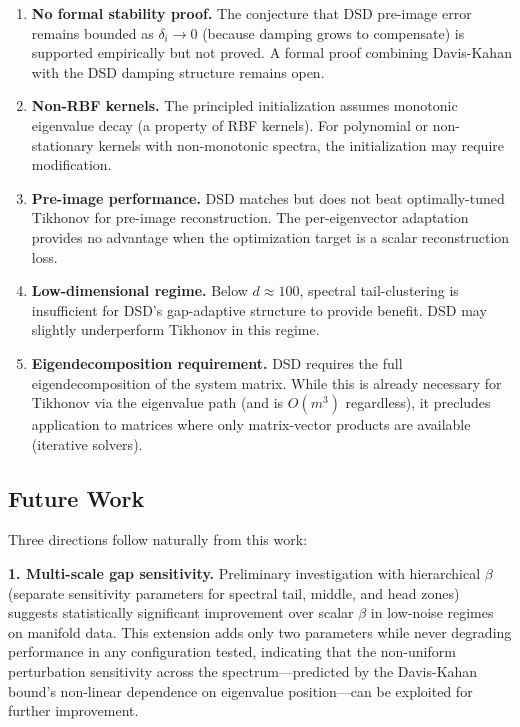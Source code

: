 \documentclass[preprint,review,12pt]{elsarticle}
\begin{document}
\begin{enumerate}
\item \textbf{No formal stability proof.} The conjecture that DSD pre-image error remains bounded as $\delta_i \to 0$ (because damping grows to compensate) is supported empirically but not proved. A formal proof combining Davis-Kahan with the DSD damping structure remains open.

\item \textbf{Non-RBF kernels.} The principled initialization assumes monotonic eigenvalue decay (a property of RBF kernels). For polynomial or non-stationary kernels with non-monotonic spectra, the initialization may require modification.

\item \textbf{Pre-image performance.} DSD matches but does not beat optimally-tuned Tikhonov for pre-image reconstruction. The per-eigenvector adaptation provides no advantage when the optimization target is a scalar reconstruction loss.

\item \textbf{Low-dimensional regime.} Below $d \approx 100$, spectral tail-clustering is insufficient for DSD's gap-adaptive structure to provide benefit. DSD may slightly underperform Tikhonov in this regime.

\item \textbf{Eigendecomposition requirement.} DSD requires the full eigendecomposition of the system matrix. While this is already necessary for Tikhonov via the eigenvalue path (and is $O(m^3)$ regardless), it precludes application to matrices where only matrix-vector products are available (iterative solvers).
\end{enumerate}

\subsection{Future Work}

Three directions follow naturally from this work:

\textbf{1. Multi-scale gap sensitivity.} Preliminary investigation with hierarchical $\beta$ (separate sensitivity parameters for spectral tail, middle, and head zones) suggests statistically significant improvement over scalar $\beta$ in low-noise regimes on manifold data. This extension adds only two parameters while never degrading performance in any configuration tested, indicating that the non-uniform perturbation sensitivity across the spectrum---predicted by the Davis-Kahan bound's non-linear dependence on eigenvalue position---can be exploited for further improvement.
\end{document}
